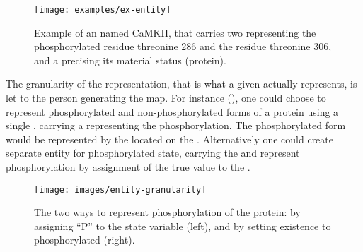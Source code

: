 
\begin{figure}[H]
  \centering
  \texttt{[image: examples/ex-entity]}
  \caption{Example of an  named CaMKII, that carries two  representing the phosphorylated residue threonine 286 and the residue threonine 306, and a  precising its material status (protein).}
  \label{fig:ex-entity}
\end{figure}

The granularity of the representation, that is what a given  actually represents, is let to the person generating the map. For instance (), one could choose to represent phosphorylated and non-phosphorylated forms of a protein using a single , carrying a  representing the phosphorylation. The phosphorylated form would be represented by the  located on the . Alternatively one could create separate entity for phosphorylated state, carrying the   and represent phosphorylation by assignment of the true value to the  .

\begin{figure}[H]
  \centering
  \texttt{[image: images/entity-granularity]}
  \caption{The two ways to represent phosphorylation of the protein: by assigning ``P'' to the state variable (left), and by setting existence to phosphorylated  (right).}
  \label{fig:entity-granularity}
\end{figure}

